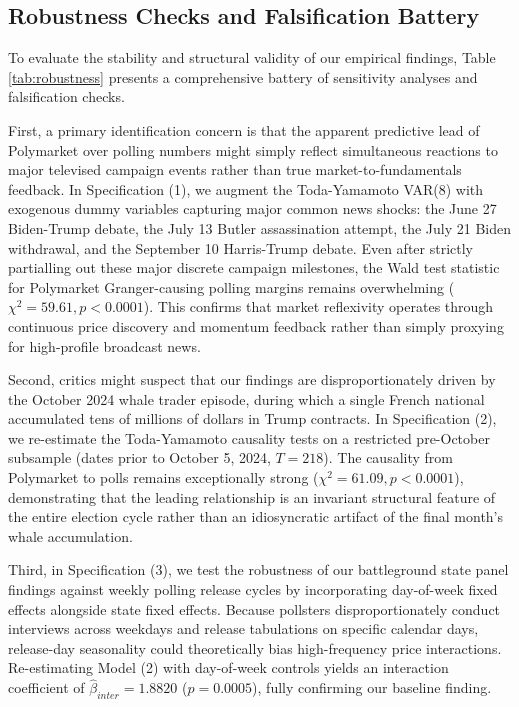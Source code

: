 \documentclass[12pt]{article}
\begin{document}


\subsection{Robustness Checks and Falsification Battery}
To evaluate the stability and structural validity of our empirical findings, Table \ref{tab:robustness} presents a comprehensive battery of sensitivity analyses and falsification checks.



First, a primary identification concern is that the apparent predictive lead of Polymarket over polling numbers might simply reflect simultaneous reactions to major televised campaign events rather than true market-to-fundamentals feedback. In Specification (1), we augment the Toda-Yamamoto VAR(8) with exogenous dummy variables capturing major common news shocks: the June 27 Biden-Trump debate, the July 13 Butler assassination attempt, the July 21 Biden withdrawal, and the September 10 Harris-Trump debate. Even after strictly partialling out these major discrete campaign milestones, the Wald test statistic for Polymarket Granger-causing polling margins remains overwhelming ($\chi^2 = 59.61, p < 0.0001$). This confirms that market reflexivity operates through continuous price discovery and momentum feedback rather than simply proxying for high-profile broadcast news.

Second, critics might suspect that our findings are disproportionately driven by the October 2024 whale trader episode, during which a single French national accumulated tens of millions of dollars in Trump contracts. In Specification (2), we re-estimate the Toda-Yamamoto causality tests on a restricted pre-October subsample (dates prior to October 5, 2024, $T=218$). The causality from Polymarket to polls remains exceptionally strong ($\chi^2 = 61.09, p < 0.0001$), demonstrating that the leading relationship is an invariant structural feature of the entire election cycle rather than an idiosyncratic artifact of the final month's whale accumulation.

Third, in Specification (3), we test the robustness of our battleground state panel findings against weekly polling release cycles by incorporating day-of-week fixed effects alongside state fixed effects. Because pollsters disproportionately conduct interviews across weekdays and release tabulations on specific calendar days, release-day seasonality could theoretically bias high-frequency price interactions. Re-estimating Model (2) with day-of-week controls yields an interaction coefficient of $\hat{\beta}_{inter} = 1.8820$ ($p = 0.0005$), fully confirming our baseline finding. 
\end{document}
